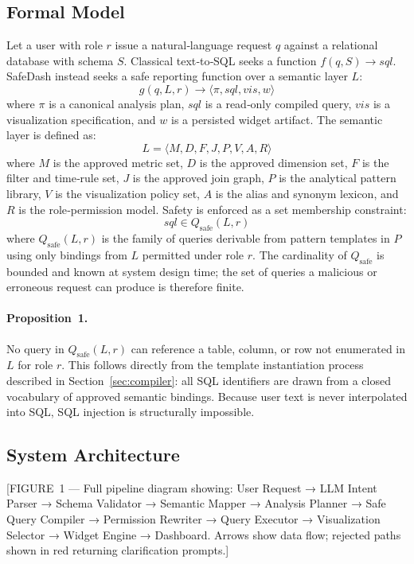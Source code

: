 \documentclass[11pt]{article}
\begin{document}
\subsection{Formal Model}
Let a user with role $r$ issue a natural‑language request $q$ against a relational database with schema $S$. Classical text‑to‑SQL seeks a function $f(q,S)\rightarrow sql$. SafeDash instead seeks a safe reporting function over a semantic layer $L$:
\begin{equation}
 g(q, L, r) \rightarrow \langle \pi, sql, vis, w \rangle
\end{equation}
where $\pi$ is a canonical analysis plan, $sql$ is a read‑only compiled query, $vis$ is a visualization specification, and $w$ is a persisted widget artifact. The semantic layer is defined as:
\begin{equation}
 L = \langle M, D, F, J, P, V, A, R \rangle
\end{equation}
where $M$ is the approved metric set, $D$ is the approved dimension set, $F$ is the filter and time‑rule set, $J$ is the approved join graph, $P$ is the analytical pattern library, $V$ is the visualization policy set, $A$ is the alias and synonym lexicon, and $R$ is the role‑permission model. Safety is enforced as a set membership constraint:
\begin{equation}
 sql \in Q_{\mathrm{safe}}(L,r)
\end{equation}
where $Q_{\mathrm{safe}}(L,r)$ is the family of queries derivable from pattern templates in $P$ using only bindings from $L$ permitted under role $r$. The cardinality of $Q_{\mathrm{safe}}$ is bounded and known at system design time; the set of queries a malicious or erroneous request can produce is therefore finite.

\paragraph{Proposition 1.} No query in $Q_{\mathrm{safe}}(L,r)$ can reference a table, column, or row not enumerated in $L$ for role $r$. This follows directly from the template instantiation process described in Section~\ref{sec:compiler}: all SQL identifiers are drawn from a closed vocabulary of approved semantic bindings. Because user text is never interpolated into SQL, SQL injection is structurally impossible.

\subsection{System Architecture\label{sec:architecture}}
[FIGURE 1 — Full pipeline diagram showing: User Request → LLM Intent Parser → Schema Validator → Semantic Mapper → Analysis Planner → Safe Query Compiler → Permission Rewriter → Query Executor → Visualization Selector → Widget Engine → Dashboard. Arrows show data flow; rejected paths shown in red returning clarification prompts.]
\end{document}
